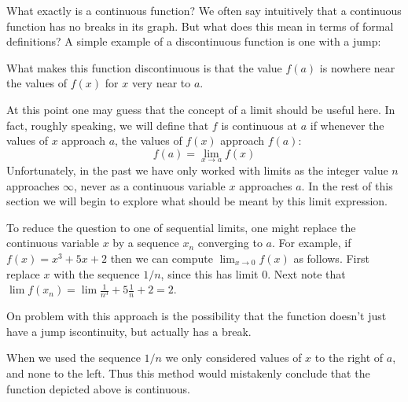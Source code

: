 \documentclass[11pt,oneside]{amsbook}
\theoremstyle{definition}
\theoremstyle{plain}
\theoremstyle{definition}
\theoremstyle{remark}
\numberwithin{equation}{section}
\numberwithin{figure}{section}
\begin{document}
What exactly is a continuous function? We often say intuitively that a continuous function has no breaks in its graph. But what does this mean in terms of formal definitions? A simple example of a discontinuous function is one with a jump:
\begin{center}
\end{center}
What makes this function discontinuous is that the value $f(a)$ is nowhere near the values of $f(x)$ for $x$ very near to $a$.

At this point one may guess that the concept of a limit should be useful here. In fact, roughly speaking, we will define that $f$ is continuous at $a$ if whenever the values of $x$ approach $a$, the values of $f(x)$ approach $f(a)$:
\[f(a)=\lim_{x\to a}f(x)
\]
Unfortunately, in the past we have only worked with limits as the integer value $n$ approaches $\infty$, never as a continuous variable $x$ approaches $a$. In the rest of this section we will begin to explore what should be meant by this limit expression.

To reduce the question to one of sequential limits, one might replace the continuous variable $x$ by a sequence $x_n$ converging to $a$. For example, if $f(x)=x^3+5x+2$ then we can compute $\lim_{x\to0}f(x)$ as follows. First replace $x$ with the sequence $1/n$, since this has limit $0$. Next note that $\lim f(x_n)=\lim \frac{1}{n^3}+5\frac{1}{n}+2=2$.

On problem with this approach is the possibility that the function doesn't just have a jump iscontinuity, but actually has a break.
\begin{center}
\end{center}
When we used the sequence $1/n$ we only considered values of $x$ to the right of $a$, and none to the left. Thus this method would mistakenly conclude that the function depicted above is continuous.
\end{document}
